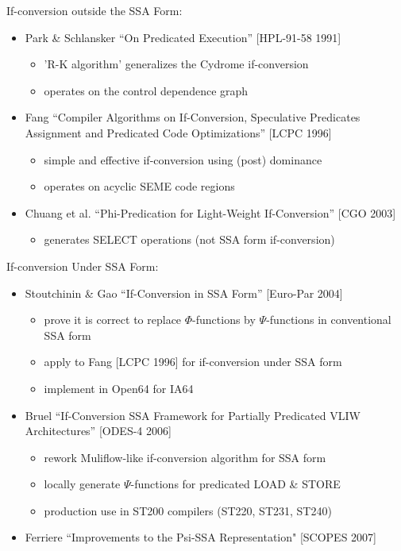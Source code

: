 If-conversion outside the SSA Form:
\begin{itemize}

\item Park \& Schlansker ``On Predicated Execution'' [HPL-91-58 1991]
\begin{itemize}
\item 'R-K algorithm' generalizes the Cydrome if-conversion
\item operates on the control dependence graph
\end{itemize}

\item Fang ``Compiler Algorithms on If-Conversion, Speculative Predicates
Assignment and Predicated Code Optimizations'' [LCPC 1996]
\begin{itemize}
\item simple and effective if-conversion using (post) dominance
\item operates on acyclic SEME code regions
\end{itemize}

\item Chuang et al. ``Phi-Predication for Light-Weight If-Conversion'' [CGO
2003]
\begin{itemize}
\item generates SELECT operations (not SSA form if-conversion)
\end{itemize}

\end{itemize}

If-conversion Under SSA Form:
\begin{itemize}

\item Stoutchinin \& Gao ``If-Conversion in SSA Form'' [Euro-Par 2004]
\begin{itemize}
\item prove it is correct to replace $\Phi$-functions by $\Psi$-functions
in conventional SSA form
\item apply to Fang [LCPC 1996] for if-conversion under SSA form
\item implement in Open64 for IA64
\end{itemize}

\item Bruel ``If-Conversion SSA Framework for Partially Predicated VLIW
Architectures'' [ODES-4 2006]
\begin{itemize}
\item rework Muliflow-like if-conversion algorithm for SSA form
\item locally generate $\Psi$-functions for predicated LOAD \& STORE
\item production use in ST200 compilers (ST220, ST231, ST240)
\end{itemize}

\item Ferriere ``Improvements to the Psi-SSA Representation" [SCOPES 2007]

\end{itemize}

